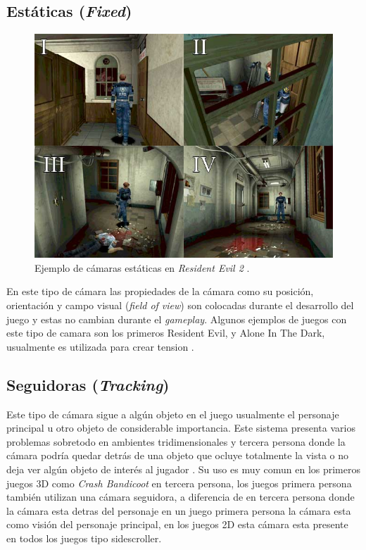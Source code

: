\subsection{Estáticas (\emph{Fixed})}
\begin{figure}
\includegraphics[width=\linewidth]{semana2/resident_evil_camerawork.jpg} 
\caption{Ejemplo de cámaras estáticas en \emph{Resident Evil 2} \cite{fixed_camera}.}
\end{figure}
En este tipo de cámara las propiedades de la cámara como su posición, orientación y campo visual (\emph{field of view}) son colocadas durante el desarrollo del juego y estas no cambian durante el \emph{gameplay}. Algunos ejemplos de juegos con este tipo de camara son los primeros Resident Evil, y Alone In The Dark, usualmente es utilizada para crear tension \cite{res5_review}\cite{fixed_camera}.
\subsection{Seguidoras (\emph{Tracking})}
Este tipo de cámara sigue a algún objeto en el juego usualmente el personaje principal u otro objeto de considerable importancia. Este sistema presenta varios problemas sobretodo en ambientes tridimensionales y tercera persona donde la cámara podría quedar detrás de una objeto que ocluye totalmente la vista o no deja ver algún objeto de interés al jugador \cite{fund_gamedesign}. Su uso es muy comun en los primeros juegos 3D como \emph{Crash Bandicoot} en tercera persona, los juegos primera persona también utilizan una cámara seguidora, a diferencia de en tercera persona donde la cámara esta detras del personaje en un juego primera persona la cámara esta como visión del personaje principal, en los juegos 2D esta cámara esta presente en todos los juegos tipo sidescroller.
\newpage
